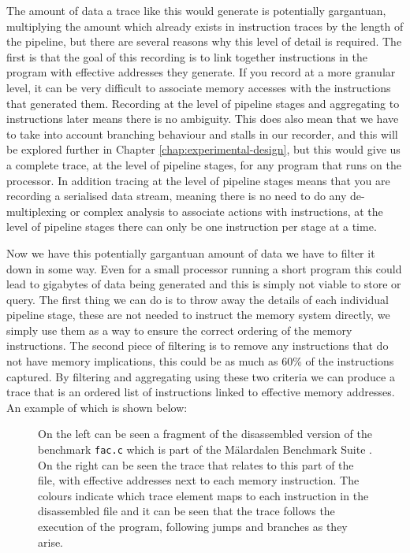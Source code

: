 The amount of data a trace like this would generate is potentially gargantuan, multiplying the amount which already exists in instruction traces by the length of the pipeline, but there are several reasons why this level of detail is required. The first is that the goal of this recording is to link together instructions in the program with effective addresses they generate. If you record at a more granular level, it can be very difficult to associate memory accesses with the instructions that generated them. Recording at the level of pipeline stages and aggregating to instructions later means there is no ambiguity. This does also mean that we have to take into account branching behaviour and stalls in our recorder, and this will be explored further in Chapter \ref{chap:experimental-design}, but this would give us a complete trace, at the level of pipeline stages, for any program that runs on the processor. In addition tracing at the level of pipeline stages means that you are recording a serialised data stream, meaning there is no need to do any de-multiplexing or complex analysis to associate actions with instructions, at the level of pipeline stages there can only be one instruction per stage at a time. 

Now we have this potentially gargantuan amount of data we have to filter it down in some way. Even for a small processor running a short program this could lead to gigabytes of data being generated and this is simply not viable to store or query. The first thing we can do is to throw away the details of each individual pipeline stage, these are not needed to instruct the memory system directly, we simply use them as a way to ensure the correct ordering of the memory instructions. The second piece of filtering is to remove any instructions that do not have memory implications, this could be as much as 60\% of the instructions captured. By filtering and aggregating using these two criteria we can produce a trace that is an ordered list of instructions linked to effective memory addresses. An example of which is shown below:

\begin{figure}
	
	\caption[Program Fragment with Trace]{On the left can be seen a fragment of the disassembled version of the benchmark \texttt{fac.c} which is part of the Mälardalen Benchmark Suite \cite{gustafssonMalardalenWCETBenchmarks2010}. On the right can be seen the trace that relates to this part of the file, with effective addresses next to each memory instruction. The colours indicate which trace element maps to each instruction in the disassembled file and it can be seen that the trace follows the execution of the program, following jumps and branches as they arise.}
\end{figure}


